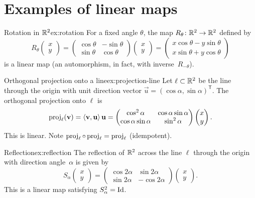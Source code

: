 \section{Examples of linear maps}\label{sec:linear-map-examples}

\begin{example}{Rotation in ${\mathbb{R}}^2$}{ex:rotation}
For a fixed angle $\theta$, the map $R_\theta\colon{\mathbb{R}}^2\to{\mathbb{R}}^2$
defined by
\[
  R_\theta\!\begin{pmatrix}x\\y\end{pmatrix}
  = \begin{pmatrix}\cos\theta & -\sin\theta\\
    \sin\theta & \cos\theta\end{pmatrix}
    \begin{pmatrix}x\\y\end{pmatrix}
  = \begin{pmatrix}x\cos\theta - y\sin\theta\\
    x\sin\theta + y\cos\theta\end{pmatrix}
\]
is a linear map (an automorphism, in fact, with inverse~$R_{-\theta}$).
\end{example}

\begin{example}{Orthogonal projection onto a line}{ex:projection-line}
Let $\ell\subset{\mathbb{R}}^2$ be the line through the origin with unit
direction vector $\vec{u} = (\cos\alpha,\sin\alpha)^{\mathsf{T}}$.
The orthogonal projection onto $\ell$ is
\[
  \operatorname{proj}_\ell(\mathbf{v}) = \langle\mathbf{v},\mathbf{u}\rangle\,\mathbf{u}
  = \begin{pmatrix}\cos^2\alpha & \cos\alpha\sin\alpha\\
    \cos\alpha\sin\alpha & \sin^2\alpha\end{pmatrix}
  \begin{pmatrix}x\\y\end{pmatrix}.
\]
This is linear. Note $\operatorname{proj}_\ell \circ \operatorname{proj}_\ell = \operatorname{proj}_\ell$
(idempotent).
\end{example}

\begin{example}{Reflection}{ex:reflection}
The reflection of ${\mathbb{R}}^2$ across the line $\ell$ through the origin
with direction angle~$\alpha$ is given by
\[
  S_\alpha\!\begin{pmatrix}x\\y\end{pmatrix}
  = \begin{pmatrix}\cos 2\alpha & \sin 2\alpha\\
    \sin 2\alpha & -\cos 2\alpha\end{pmatrix}
  \begin{pmatrix}x\\y\end{pmatrix}.
\]
This is a linear map satisfying $S_\alpha^2 = \operatorname{Id}$.
\end{example}

